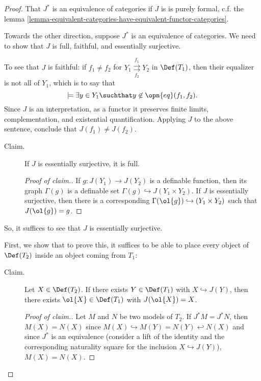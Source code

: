 \begin{proof}
  That $J^*$ is an equivalence of categories if $J $ is is purely formal, c.f. the lemma \ref{lemma-equivalent-categories-have-equivalent-functor-categories}.

  Towards the other direction, suppose $J^*$ is an equivalence of categories. We need to show that $J$ is full, faithful, and essentially surjective.

  To see that $J$ is faithful: if $f_1 \neq f_2$ for $Y_1 \overset{f_1}{\underset{f_2}{\rightrightarrows}} Y_2$ in $\Def(T_1)$, then their equalizer is not all of $Y_1$, which is to say that
  $$
\models \exists y \in Y_1 \suchthat y \not \in \opn{eq}(f_1, f_2).
$$
Since $J$ is an interpretation, as a functor it preserves finite limits, complementation, and existential quantification. Applying $J$ to the above sentence, conclude that $J(f_1) \neq J(f_2)$.



\begin{description}
\item[Claim.] If $J$ is essentially surjective, it is full.
  \begin{proof}[Proof of claim.]
If $g : J(Y_1) \to J(Y_2)$ is a definable function, then its graph $\Gamma(g)$ is a definable set $\Gamma(g) \hookrightarrow J(Y_1 \times Y_2)$. If $J$ is essentially surjective, then there is a corresponding $\Gamma(\ol{g}) \hookrightarrow (Y_1 \times Y_2)$ such that $J(\ol{g}) = g$.
    \end{proof}
  \end{description}

  So, it suffices to see that $J$ is essentially surjective.

  First, we show that to prove this, it suffices to be able to place every object of $\Def(T_2)$ inside an object coming from $T_1$:

  \begin{description}
\item[Claim.] Let $X \in \Def(T_2)$. If there exists $Y \in \Def(T_1)$ with $X \hookrightarrow J(Y)$, then there exists $\ol{X} \in \Def(T_1)$ with $J(\ol{X}) = X$.
  \begin{proof}[Proof of claim.]
Let $M$ and $N$ be two models of $T_2$. If $J^*M = J^* N$, then $M(X) = N(X)$ since $M(X) \hookrightarrow M(Y) = N(Y) \hookleftarrow N(X)$ and since $J^*$ is an equivalence (consider a lift of the identity and the corresponding naturality square for the inclusion $X \hookrightarrow J(Y)$), $M(X) = N(X)$.
\end{proof}
\end{description}


\end{proof}
